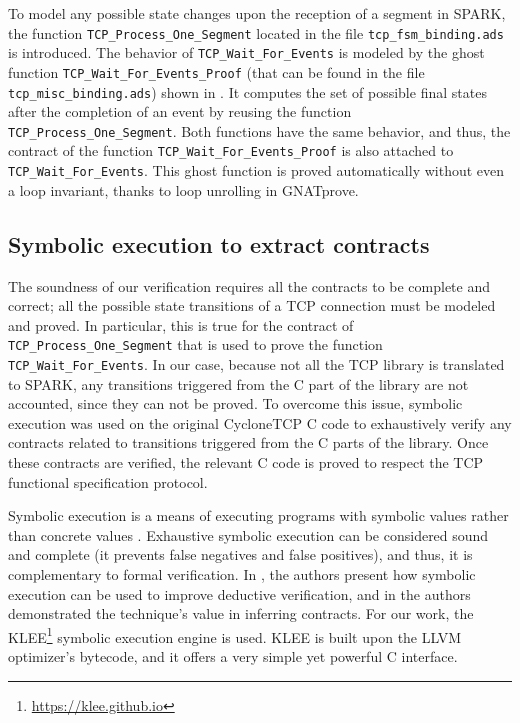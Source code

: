 \documentclass[conference]{IEEEtran}
\def\spark#1{\lstinline[language=Ada]{#1}}
\begin{document}
To model any possible state changes upon the reception of a segment in SPARK, the function \spark{TCP_Process_One_Segment} located in the file \texttt{tcp\_fsm\_binding.ads} is introduced.
The behavior of \spark{TCP_Wait_For_Events} is modeled by the ghost function \spark{TCP_Wait_For_Events_Proof} (that can be found in the file \texttt{tcp\_misc\_binding.ads}) shown in . It computes the set of possible final states after the completion of an event by reusing the function \spark{TCP_Process_One_Segment}. Both functions have the same behavior, and thus, the contract of the function \spark{TCP_Wait_For_Events_Proof} is also attached to \spark{TCP_Wait_For_Events}. This ghost function is proved automatically without even a loop invariant, thanks to loop unrolling in GNATprove.


\subsection{Symbolic execution to extract contracts}

The soundness of our verification requires all the contracts to be complete and correct; all the possible state transitions of a TCP connection must be modeled and proved.  In particular, this is true for the contract of \spark{TCP_Process_One_Segment} that is used to prove the function \spark{TCP_Wait_For_Events}. In our case, because not all the TCP library is translated to SPARK, any transitions triggered from the C part of the library are not accounted, since they can not be proved. To overcome this issue, symbolic execution was used on the original CycloneTCP C code to exhaustively verify any contracts related to transitions triggered from the C parts of the library. Once these contracts are verified, the relevant C code is proved to respect the TCP functional specification protocol.

Symbolic execution is a means of executing programs with symbolic values rather than concrete values \cite{symbolic_exec_survey:2018}. Exhaustive symbolic execution can be considered sound and complete (it prevents false negatives and false positives), and thus, it is complementary to formal verification. In \cite{vanoverberghe2008using}, the authors present how symbolic execution can be used to improve deductive verification, and in \cite{kassios2012comparing} the authors demonstrated the technique's value in inferring contracts. For our work, the KLEE\footnote{\url{https://klee.github.io}} symbolic execution engine is used. KLEE is built upon the LLVM optimizer's bytecode, and it offers a very simple yet powerful C interface.
\end{document}
